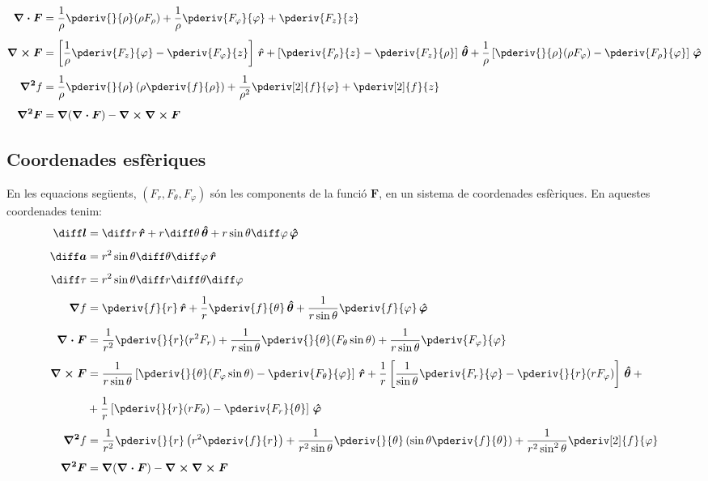\documentclass[catalan,a4paper,twoside,11pt]{article}
\begin{document}
\begin{align}
    \boldsymbol{\nabla\cdot F} &= \frac{1}{\rho}\pderiv{}{\rho}(\rho F_\rho) +
    \frac{1}{\rho}\pderiv{F_\varphi}{\varphi}+ \pderiv{F_z}{z}\\[1ex]
    \boldsymbol{\nabla\times F} &= \left[\frac{1}{\rho}\pderiv{F_z}{\varphi}-
    \pderiv{F_\varphi}{z}\right]\va +
    \left[\pderiv{F_\rho}{z}-\pderiv{F_z}{\rho}\right]\vb +
    \frac{1}{\rho}\left[\pderiv{}{\rho}(\rho F_\varphi)-\pderiv{F_\rho}{\varphi}\right]\vc\\[1ex]
    \boldsymbol{\nabla^2}f &= \frac{1}{\rho}\pderiv{}{\rho}\left(\rho\pderiv{f}{\rho}
    \right)
    + \frac{1}{\rho^2}\pderiv[2]{f}{\varphi}+ \pderiv[2]{f}{z}\\[1ex]
    \boldsymbol{\nabla^2F} &=\boldsymbol{\nabla}(\boldsymbol{\nabla\cdot
    F}) -\boldsymbol{\nabla\times\nabla\times F}
\end{align}


\subsection{Coordenades esf\`{e}riques}

\renewcommand{\va}{\ensuremath{\,\boldsymbol{\hat{r}}}}
\renewcommand{\vb}{\ensuremath{\,\boldsymbol{\hat{\theta}}}}
\renewcommand{\vc}{\ensuremath{\,\boldsymbol{\hat{\varphi}}}}
En les equacions seg\"{u}ents, $(F_r,F_\theta,F_\varphi)$  s\'{o}n
les components de la funci\'{o}  $\boldsymbol{F}$, en un sistema de
coordenades esf\`{e}riques. En aquestes coordenades tenim:
\begin{align}
    \boldsymbol{\diff l} &= \diff r \va + r\diff\theta \vb + r \sin\theta\diff \varphi \vc\\[1ex]
    \boldsymbol{\diff a} &= r^2 \sin\theta \diff \theta \diff \varphi \va\\[1ex]
    \diff\tau &= r^2 \sin\theta\diff r \diff \theta \diff \varphi\\[1ex]
    \boldsymbol{\nabla}f &= \pderiv{f}{r}\va + \frac{1}{r}\pderiv{f}{\theta}\vb
    + \frac{1}{r\sin\theta}\pderiv{f}{\varphi}\vc\\[1ex]
    \boldsymbol{\nabla\cdot F} &= \frac{1}{r^2}\pderiv{}{r}(r^2 F_r) +
    \frac{1}{r\sin\theta}\pderiv{}{\theta}(F_\theta\sin\theta)+
    \frac{1}{r\sin\theta}\pderiv{F_\varphi}{\varphi}\\[1ex]
    \boldsymbol{\nabla\times F} &= \frac{1}{r\sin\theta}\left[\pderiv{}{\theta}
    (F_\varphi\sin\theta)-\pderiv{F_\theta}{\varphi}\right]\va +
    \frac{1}{r}\left[\frac{1}{\sin\theta}\pderiv{F_r}{\varphi}-
    \pderiv{}{r}(r F_\varphi)\right]\vb +{} \nonumber \\[1ex]
     &+\frac{1}{r}\left[\pderiv{}{r}(r F_\theta)-\pderiv{F_r}{\theta}\right]\vc\\[1ex]
    \boldsymbol{\nabla^2}f &= \frac{1}{r^2}\pderiv{}{r}\left(r^2\pderiv{f}{r}
    \right) + \frac{1}{r^2\sin\theta}\pderiv{}{\theta}\left(\sin\theta\pderiv{f}{\theta}\right) +
    \frac{1}{r^2\sin^2\theta}\pderiv[2]{f}{\varphi}\\[1ex]
    \boldsymbol{\nabla^2F} &=\boldsymbol{\nabla}(\boldsymbol{\nabla\cdot
    F}) -\boldsymbol{\nabla\times\nabla\times F}
\end{align}
\end{document}

